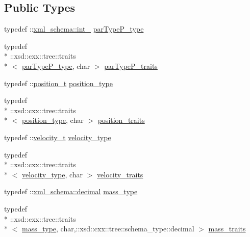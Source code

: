 \subsection*{Public Types}
\begin{DoxyCompactItemize}
\item 
typedef \-::\hyperlink{namespacexml__schema_acfa24ac68e1a188e7f44c36f7a158bf4}{xml\-\_\-schema\-::int\-\_\-} \hyperlink{classparticle__t_ab30c5ebbd1c4aabb95799f34942b72b2}{par\-Type\-P\-\_\-type}
\item 
typedef \\*
\-::xsd\-::cxx\-::tree\-::traits\\*
$<$ \hyperlink{classparticle__t_ab30c5ebbd1c4aabb95799f34942b72b2}{par\-Type\-P\-\_\-type}, char $>$ \hyperlink{classparticle__t_a8c9ecdb6ceb5ee765e0eb91714ebb8c8}{par\-Type\-P\-\_\-traits}
\item 
typedef \-::\hyperlink{classposition__t}{position\-\_\-t} \hyperlink{classparticle__t_af0130f9c47a13c68332f04389a6f0d2c}{position\-\_\-type}
\item 
typedef \\*
\-::xsd\-::cxx\-::tree\-::traits\\*
$<$ \hyperlink{classparticle__t_af0130f9c47a13c68332f04389a6f0d2c}{position\-\_\-type}, char $>$ \hyperlink{classparticle__t_a3917822f8a2a24b4674e88165aa15d24}{position\-\_\-traits}
\item 
typedef \-::\hyperlink{classvelocity__t}{velocity\-\_\-t} \hyperlink{classparticle__t_a19095006cf2a2dd955fc026420b38512}{velocity\-\_\-type}
\item 
typedef \\*
\-::xsd\-::cxx\-::tree\-::traits\\*
$<$ \hyperlink{classparticle__t_a19095006cf2a2dd955fc026420b38512}{velocity\-\_\-type}, char $>$ \hyperlink{classparticle__t_a97b4645b5dfa77c95f13a142064045db}{velocity\-\_\-traits}
\item 
typedef \-::\hyperlink{namespacexml__schema_a69bfaf24f63a8c18ebd8e21db6b343df}{xml\-\_\-schema\-::decimal} \hyperlink{classparticle__t_a38e9f2cf40d61fa77b19f068d044d294}{mass\-\_\-type}
\item 
typedef \\*
\-::xsd\-::cxx\-::tree\-::traits\\*
$<$ \hyperlink{classparticle__t_a38e9f2cf40d61fa77b19f068d044d294}{mass\-\_\-type}, char,\-::xsd\-::cxx\-::tree\-::schema\-\_\-type\-::decimal $>$ \hyperlink{classparticle__t_ab9c6167e13b441bc375cdc08fa045012}{mass\-\_\-traits}
\end{DoxyCompactItemize}
